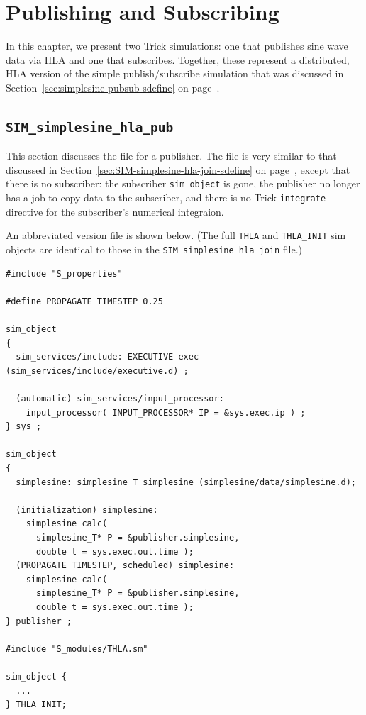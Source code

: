 \chapter{Publishing and Subscribing}
\label{sec:hla-pubsub}

In this chapter,
we present two Trick simulations:
one that publishes sine wave data via HLA
and one that subscribes.
Together, these represent a distributed, HLA
version of the simple publish/subscribe simulation that was discussed
in Section~\ref{sec:simplesine-pubsub-sdefine} on page~\pageref{sec:simplesine-pubsub-sdefine}.

\section{{\tt SIM\_simplesine\_hla\_pub}}
This section discusses the \sdefine file for a publisher.
The file is very similar to that discussed in
Section~\ref{sec:SIM-simplesine-hla-join-sdefine}
on page~\pageref{sec:SIM-simplesine-hla-join-sdefine},
except that there is no subscriber:
the subscriber {\tt sim\_object} is gone,
the publisher no longer has a job to copy data to the subscriber, and
there is no Trick {\tt integrate} directive for the
subscriber's numerical integraion.

An abbreviated version file is shown below.
(The full {\tt THLA} and {\tt THLA\_INIT} sim objects
are identical to those in the {\tt SIM\_simplesine\_hla\_join} file.)

\begin{lstlisting}[caption={{\tt SIM\_simplesine\_hla\_pub} \sdefine},label={list:SIM-simplesine-hla-pub-sdefine}]
#include "S_properties"

#define PROPAGATE_TIMESTEP 0.25

sim_object
{
  sim_services/include: EXECUTIVE exec (sim_services/include/executive.d) ;

  (automatic) sim_services/input_processor:
    input_processor( INPUT_PROCESSOR* IP = &sys.exec.ip ) ;
} sys ;

sim_object
{
  simplesine: simplesine_T simplesine (simplesine/data/simplesine.d);

  (initialization) simplesine:
    simplesine_calc(
      simplesine_T* P = &publisher.simplesine,
      double t = sys.exec.out.time );
  (PROPAGATE_TIMESTEP, scheduled) simplesine:
    simplesine_calc(
      simplesine_T* P = &publisher.simplesine,
      double t = sys.exec.out.time );
} publisher ;

#include "S_modules/THLA.sm"

sim_object {
  ...
} THLA_INIT;
\end{lstlisting}

